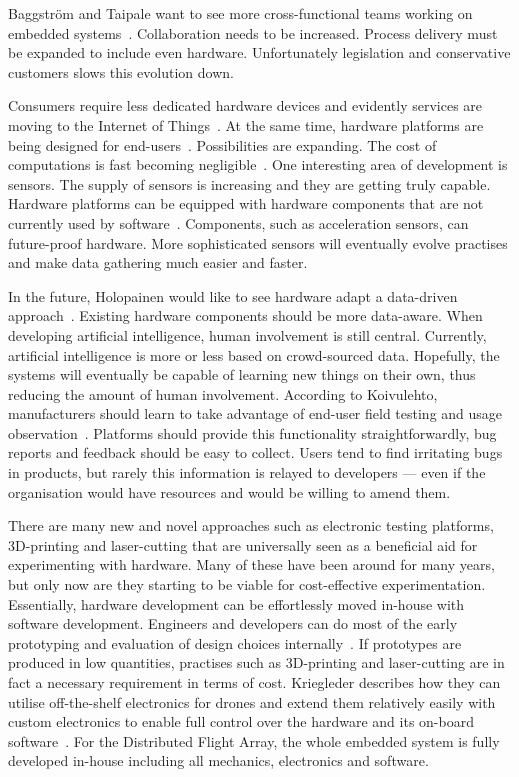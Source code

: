\documentclass[english]{tktltiki2}
\begin{document}
Baggström and Taipale want to see more cross-functional teams working on embedded systems~\cite{BT15}. Collaboration needs to be increased. Process delivery must be expanded to include even hardware. Unfortunately legislation and conservative customers slows this evolution down.

Consumers require less dedicated hardware devices and evidently services are moving to the Internet of Things~\cite{Koi15}. At the same time, hardware platforms are being designed for end-users~\cite{BT15}. Possibilities are expanding. The cost of computations is fast becoming negligible~\cite{Hol15a}. One interesting area of development is sensors. The supply of sensors is increasing and they are getting truly capable. Hardware platforms can be equipped with hardware components that are not currently used by software~\cite{BT15}. Components, such as acceleration sensors, can future-proof hardware. More sophisticated sensors will eventually evolve practises and make data gathering much easier and faster.

In the future, Holopainen would like to see hardware adapt a data-driven approach~\cite{Hol15a}. Existing hardware components should be more data-aware. When developing artificial intelligence, human involvement is still central. Currently, artificial intelligence is more or less based on crowd-sourced data. Hopefully, the systems will eventually be capable of learning new things on their own, thus reducing the amount of human involvement. According to Koivulehto, manufacturers should learn to take advantage of end-user field testing and usage observation~\cite{Koi15}. Platforms should provide this functionality straightforwardly, bug reports and feedback should be easy to collect. Users tend to find irritating bugs in products, but rarely this information is relayed to developers — even if the organisation would have resources and would be willing to amend them.

There are many new and novel approaches such as electronic testing platforms, 3D-printing and laser-cutting that are universally seen as a beneficial aid for experimenting with hardware. Many of these have been around for many years, but only now are they starting to be viable for cost-effective experimentation. Essentially, hardware development can be effortlessly moved in-house with software development. Engineers and developers can do most of the early prototyping and evaluation of design choices internally~\cite{Kri15}. If prototypes are produced in low quantities, practises such as 3D-printing and laser-cutting are in fact a necessary requirement in terms of cost. Kriegleder describes how they can utilise off-the-shelf electronics for drones and extend them relatively easily with custom electronics to enable full control over the hardware and its on-board software~\cite{Kri15}. For the Distributed Flight Array, the whole embedded system is fully developed in-house including all mechanics, electronics and software.
\end{document}
